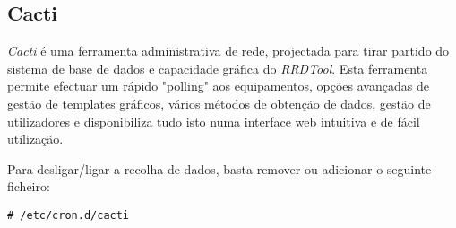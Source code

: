 \subsection{Cacti}

\emph{Cacti} é uma ferramenta administrativa de rede, projectada para tirar partido do sistema de base de dados e capacidade gráfica do \emph{RRDTool}. Esta ferramenta permite efectuar um rápido "polling" aos equipamentos, opções avançadas de gestão de templates gráficos, vários métodos de obtenção de dados, gestão de utilizadores e disponibiliza tudo isto numa interface web intuitiva e de fácil utilização.

Para desligar/ligar a recolha de dados, basta remover ou adicionar o seguinte ficheiro:

\begin{Verbatim}[commandchars=\\\{\}]
# /etc/cron.d/cacti
\end{Verbatim}
